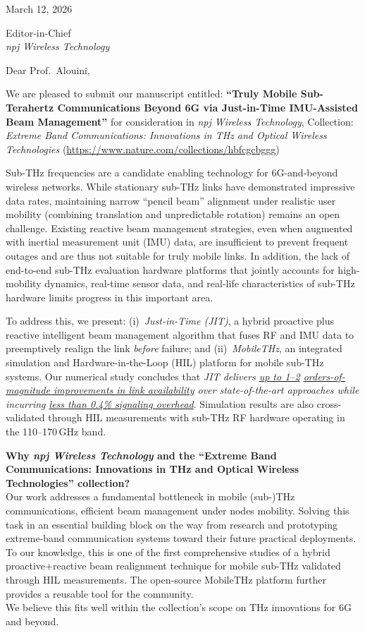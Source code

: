 \documentclass[11pt]{letter}
\begin{document}
\begin{flushright}
March 12, 2026
\end{flushright}

\bigskip
\noindent
Editor-in-Chief\\
\textit{npj Wireless Technology}

\bigskip
\noindent
Dear Prof.\ Alouini,

\medskip
\noindent
We are pleased to submit our manuscript entitled: \textbf{``Truly Mobile Sub-Terahertz Communications Beyond 6G via Just-in-Time IMU-Assisted Beam Management''} for consideration in \textit{npj Wireless Technology}, Collection: \textit{Extreme Band Communications: Innovations in THz and Optical Wireless Technologies} (\url{https://www.nature.com/collections/hbfcgcbggg})

\medskip
\noindent
Sub-THz frequencies are a candidate enabling technology for 6G-and-beyond wireless networks. While stationary sub-THz links have demonstrated impressive data rates, maintaining narrow ``pencil beam'' alignment under realistic user mobility (combining translation and unpredictable rotation) remains an open challenge. Existing reactive beam management strategies, even when augmented with inertial measurement unit (IMU) data, are insufficient to prevent frequent outages and are thus not suitable for truly mobile links. In addition, the lack of end-to-end sub-THz evaluation hardware platforms that jointly accounts for high-mobility dynamics, real-time sensor data, and real-life characteristics of sub-THz hardware limits progress in this important area.

\medskip
\noindent
To address this, we present: (i)~\emph{Just-in-Time (JIT)}, a hybrid proactive plus reactive intelligent beam management algorithm that fuses RF and IMU data to preemptively realign the link \emph{before} failure; and (ii)~\emph{MobileTHz}, an integrated simulation and Hardware-in-the-Loop (HIL) platform for mobile sub-THz systems. Our numerical study concludes that \emph{JIT delivers \underline{up to 1--2} \underline{orders-of-magnitude improvements in link availability} over state-of-the-art approaches while incurring \underline{less than 0.4\% signaling overhead}}. Simulation results are also cross-validated through HIL measurements with sub-THz RF hardware operating in the 110--170\,GHz band.

\medskip
\noindent
\textbf{Why \textit{npj Wireless Technology} and the ``Extreme Band Communications: Innovations in THz and Optical Wireless Technologies'' collection?}\\
Our work addresses a fundamental bottleneck in mobile (sub-)THz communications, efficient beam management under nodes mobility. Solving this task in an essential building block on the way from research and prototyping extreme-band communication systems toward their future practical deployments. To our knowledge, this is one of the first comprehensive studies of a hybrid proactive+reactive beam realignment technique for mobile sub-THz validated through HIL measurements. The open-source MobileTHz platform further provides a reusable tool for the community.\\We believe this fits well within the collection's scope on THz innovations for 6G and beyond.
\end{document}
